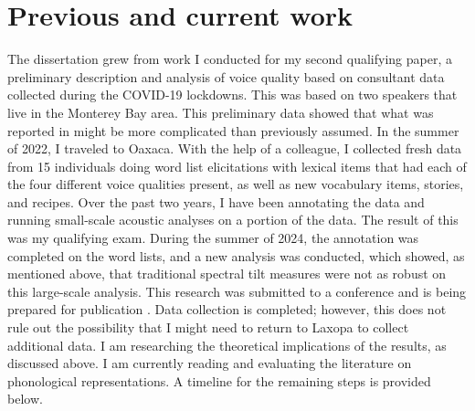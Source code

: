 \documentclass[12pt, letterpaper]{article}
\begin{document}
\section{Previous and current work} \label{sec:Work}

The dissertation grew from work I conducted for my second qualifying paper, a preliminary description and analysis of voice quality based on consultant data collected during the COVID-19 lockdowns. This was based on two speakers that live in the Monterey Bay area. This preliminary data showed that what was reported in \citep{adlerAcousticsPhonationTypes2016} might be more complicated than previously assumed. In the summer of 2022, I traveled to Oaxaca. With the help of a colleague, I collected fresh data from 15 individuals doing word list elicitations with lexical items that had each of the four different voice qualities present, as well as new vocabulary items, stories, and recipes. Over the past two years, I have been annotating the data and running small-scale acoustic analyses on a portion of the data. The result of this was my qualifying exam. During the summer of 2024, the annotation was completed on the word lists, and a new analysis was conducted, which showed, as mentioned above, that traditional spectral tilt measures were not as robust on this large-scale analysis. This research was submitted to a conference and is being prepared for publication \citep{brinkerhoffResidualH1MeasureInPreparation}. Data collection is completed; however, this does not rule out the possibility that I might need to return to Laxopa to collect additional data. I am researching the theoretical implications of the results, as discussed above. I am currently reading and evaluating the literature on phonological representations. A timeline for the remaining steps is provided below.

\end{document}
